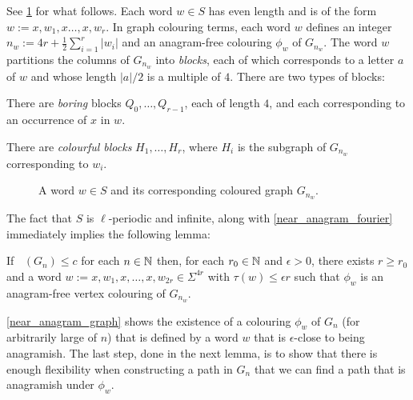 \documentclass{patmorin}
\DeclareMathOperator{\afcn}{\dot{\chi}_\pi}
\begin{document}
See \cref{bigexample} for what follows. Each word $w\in S$ has even length and is of the form $w:=x,w_1,x\ldots,x,w_{r}$.  In graph colouring terms, each word $w$ defines an integer $n_w:=4r+\tfrac{1}{2}\sum_{i=1}^r|w_i|$ and an anagram-free colouring $\phi_w$ of $G_{n_w}$. The word $w$ partitions the columns of $G_{n_w}$ into \emph{blocks}, each of which corresponds to a letter $a$ of $w$ and whose length $|a|/2$ is a multiple of $4$.  There are two types of blocks:
\begin{compactitem}
    \item There are \emph{boring} blocks $Q_0,\ldots,Q_{r-1}$, each of length $4$, and each corresponding to an occurrence of $x$ in $w$.
    \item There are \emph{colourful blocks} $H_1,\ldots,H_r$, where $H_i$ is the subgraph of $G_{n_w}$ corresponding to $w_i$.
\end{compactitem}


\begin{figure}
    \caption{A word $w\in S$ and its corresponding coloured graph $G_{n_w}$.}
    \label{bigexample}
\end{figure}

The fact that $S$ is $\ell$-periodic and infinite, along with \cref{near_anagram_fourier} immediately implies the following lemma:

\begin{lem}\label{near_anagram_graph}
    If $\afcn(G_n)\le c$ for each $n\in\mathbb{N}$ then, for each $r_0\in\mathbb{N}$ and $\epsilon>0$, there exists $r\ge r_0$ and a word $w:=x,w_1,x,\ldots,x,w_{2r}\in\Sigma^{4r}$ with $\tau(w)\le\epsilon r$ such that $\phi_w$ is an anagram-free vertex colouring of $G_{n_w}$.
\end{lem}


\cref{near_anagram_graph} shows the existence of a colouring $\phi_w$ of $G_n$ (for arbitrarily large of $n$) that is defined by a word $w$ that is $\epsilon$-close to being anagramish.  The last step, done in the next lemma, is to show that there is enough flexibility when constructing a path in $G_n$ that we can find a path that is anagramish under $\phi_w$.
\end{document}

